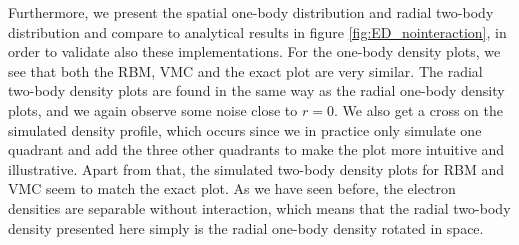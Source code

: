 Furthermore, we present the spatial one-body distribution and radial two-body distribution and compare to analytical results in figure \eqref{fig:ED_nointeraction}, in order to validate also these implementations. For the one-body density plots, we see that both the RBM, VMC and the exact plot are very similar. The radial two-body density plots are found in the same way as the radial one-body density plots, and we again observe some noise close to $r=0$. We also get a cross on the simulated density profile, which occurs since we in practice only simulate one quadrant and add the three other quadrants to make the plot more intuitive and illustrative. Apart from that, the simulated two-body density plots for RBM and VMC seem to match the exact plot. As we have seen before, the electron densities are separable without interaction, which means that the radial two-body density presented here simply is the radial one-body density rotated in space. 

